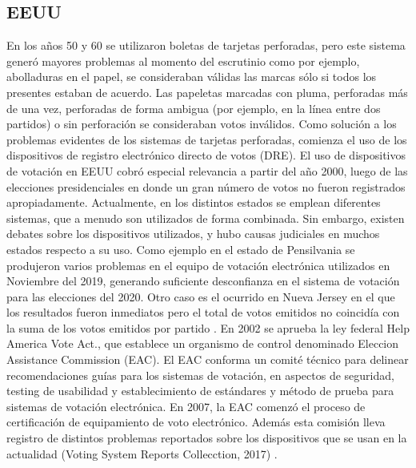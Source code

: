 \subsection{EEUU}
En los años 50 y 60 se utilizaron boletas de tarjetas perforadas, pero este sistema generó mayores problemas al momento del escrutinio como por ejemplo, abolladuras en el papel, se consideraban válidas las marcas sólo si todos los presentes estaban de acuerdo. Las papeletas marcadas con pluma, perforadas más de una vez, perforadas de forma ambigua (por ejemplo, en la línea entre dos partidos) o sin perforación se consideraban votos inválidos.
Como solución a los problemas evidentes de los sistemas de tarjetas perforadas, comienza el uso de los dispositivos de registro electrónico directo de votos (DRE). El uso de dispositivos de votación en EEUU cobró especial relevancia a partir del año 2000, luego de las elecciones presidenciales en donde un gran número de votos no fueron registrados apropiadamente.  \newline
Actualmente, en los distintos estados se emplean diferentes sistemas, que a menudo son utilizados de forma combinada.
Sin embargo, existen debates sobre los dispositivos utilizados, y hubo causas judiciales en muchos estados respecto a su uso. Como ejemplo en el estado de Pensilvania se produjeron varios problemas en el equipo de votación electrónica utilizados en Noviembre del 2019, generando suficiente desconfianza en el sistema de votación para las elecciones del 2020. Otro caso es el ocurrido en Nueva Jersey en el que los resultados fueron inmediatos pero el total de votos emitidos no coincidía con la suma de los votos emitidos por partido \cite{eleccionesEEUU}.
En 2002 se aprueba la ley federal Help America Vote Act., que establece un organismo de control denominado Eleccion Assistance Commission (EAC). El EAC conforma un comité técnico para delinear recomendaciones guías para los sistemas de votación, en aspectos de seguridad, testing de usabilidad y establecimiento de estándares y método de prueba para sistemas de votación electrónica. En 2007, la EAC comenzó el proceso de certificación de equipamiento de voto electrónico. Además esta comisión lleva registro de distintos problemas reportados sobre los dispositivos que se usan en la actualidad (Voting System Reports Collecction, 2017) \cite{problemasReportados}.

